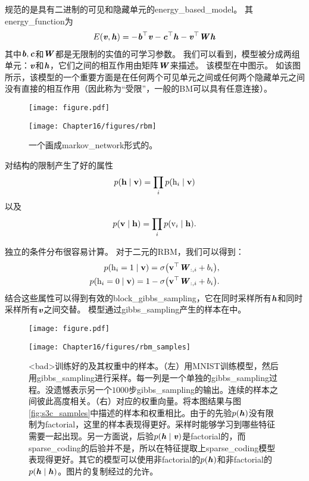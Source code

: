 规范的是具有二进制的可见和隐藏单元的\gls{energy_based_model}。 其\gls{energy_function}为
\begin{align}
\label{eqn:1610}
E(\boldsymbol{\mathit{v}},\boldsymbol{\mathit{h}}) = -\boldsymbol{\mathit{b}}^{\top}\boldsymbol{\mathit{v}} - \boldsymbol{\mathit{c}}^{\top}\boldsymbol{\mathit{h}} - \boldsymbol{\mathit{v}}^{\top}\boldsymbol{\mathit{W}}\boldsymbol{\mathit{h}}
\end{align}
其中$\boldsymbol{\mathit{b}},\boldsymbol{\mathit{c}}$和$\boldsymbol{\mathit{W}}$都是无限制的实值的可学习参数。
我们可以看到，模型被分成两组单元：$\boldsymbol{\mathit{v}}$和$\boldsymbol{\mathit{h}}$，它们之间的相互作用由矩阵$\boldsymbol{\mathit{W}}$来描述。
该模型在中图示。
如该图所示，该模型的一个重要方面是在任何两个可见单元之间或任何两个隐藏单元之间没有直接的相互作用（因此称为``受限''，一般的\gls{BM}可以具有任意连接）。



\begin{figure}[!htb]
\ifOpenSource
\centerline{\texttt{[image: figure.pdf]}}
\else
	\centerline{\texttt{[image: Chapter16/figures/rbm]}}	
\fi
	\caption{一个画成\gls{markov_network}形式的。}
	\label{fig:rbm}
\end{figure}



对结构的限制产生了好的属性
\begin{align}
\label{eqn:1611}
p(\mathbf{h}\mid\mathbf{v}) = \prod_i p(\mathrm{h}_i\mid \mathbf{v})
\end{align}
以及
\begin{align}
\label{eqn:1612}
p(\mathbf{v}\mid\mathbf{h}) = \prod_i p(\mathrm{v}_i\mid \mathbf{h}).
\end{align}


独立的条件分布很容易计算。
对于二元的\gls{RBM}，我们可以得到：
\begin{align}
\label{eqn:1613}
\begin{aligned}
p(\mathrm{h}_i = 1\mid\mathbf{v}) = \sigma\big(\mathbf{v}^{\top}\boldsymbol{\mathit{W}}_{:,i} + b_i\big),\\
p(\mathrm{h}_i = 0\mid\mathbf{v}) = 1 - \sigma\big(\mathbf{v}^{\top}\boldsymbol{\mathit{W}}_{:,i} + b_i\big).\\
\end{aligned}
\end{align}
结合这些属性可以得到有效的\gls{block_gibbs_sampling}，它在同时采样所有$\boldsymbol{\mathit{h}}$和同时采样所有$\boldsymbol{\mathit{v}}$之间交替。
模型通过\gls{gibbs_sampling}产生的样本在中。

\begin{figure}[!htb]
\ifOpenSource
\centerline{\texttt{[image: figure.pdf]}}
\else
	\centerline{\texttt{[image: Chapter16/figures/rbm\_samples]}}	
\fi
	\caption{<bad>训练好的及其权重中的样本。（左）用MNIST训练模型，然后用\gls{gibbs_sampling}进行采样。每一列是一个单独的\gls{gibbs_sampling}过程。没遗憾表示另一个$1000$步\gls{gibbs_sampling}的输出。连续的样本之间彼此高度相关。（右）对应的权重向量。将本图结果与图\ref{fig:s3c_samples}中描述的样本和权重相比。由于的先验$p(\boldsymbol{\mathit{h}})$没有限制为\gls{factorial}，这里的样本表现得更好。采样时能够学习到哪些特征需要一起出现。另一方面说，后验$p(\boldsymbol{\mathit{h}} \mid \boldsymbol{\mathit{v}})$是\gls{factorial}的，而\gls{sparse_coding}的后验并不是，所以在特征提取上\gls{sparse_coding}模型表现得更好。其它的模型可以使用非\gls{factorial}的$p(\boldsymbol{\mathit{h}})$和非\gls{factorial}的$p(\boldsymbol{\mathit{h}} \mid \boldsymbol{\mathit{h}})$。图片的复制经过\citet{lisa_tutorial_rbm}的允许。}
	\label{fig:rbm_sample}
\end{figure}


